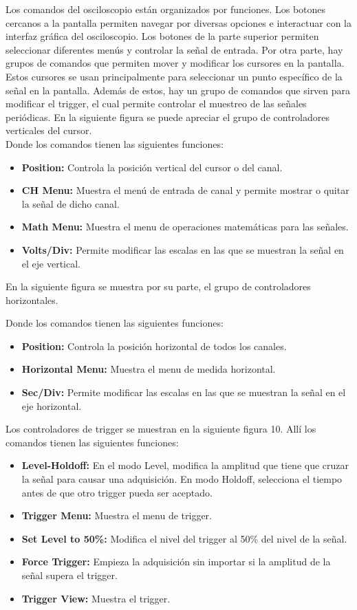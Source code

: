 \documentclass{scrartcl}
\begin{document}
Los comandos del osciloscopio están organizados por funciones. Los botones cercanos a la pantalla permiten navegar por diversas opciones e interactuar con la interfaz gráfica del osciloscopio. Los botones de la parte superior permiten seleccionar diferentes menús y controlar la señal de entrada. Por otra parte, hay grupos de comandos que permiten mover y modificar los cursores en la pantalla. Estos cursores se usan principalmente para seleccionar un punto específico de la señal en la pantalla. Además de estos, hay un grupo de comandos que sirven para modificar el trigger, el cual permite controlar el muestreo de las señales periódicas. En la siguiente figura se puede apreciar el grupo de controladores verticales del cursor.\\


Donde los comandos tienen las siguientes funciones:
\begin{itemize}
	\item \textbf{Position:} Controla la posición vertical del cursor o del canal. 
	\item \textbf{CH Menu:} Muestra el menú de entrada de canal y permite mostrar o quitar la señal de dicho canal.
	\item \textbf{Math Menu:} Muestra el menu de operaciones matemáticas para las señales.
	\item \textbf{Volts/Div:} Permite modificar las escalas en las que se muestran la señal en el eje vertical.

\end{itemize}

En la siguiente figura se muestra por su parte, el grupo de controladores horizontales.


Donde los comandos tienen las siguientes funciones:
\begin{itemize}
	\item \textbf{Position:} Controla la posición horizontal de todos los canales.
	\item \textbf{Horizontal Menu:} Muestra el menu de medida horizontal.
	\item \textbf{Sec/Div:} Permite modificar las escalas en las que se muestran la señal en el eje horizontal.
\end{itemize}

Los controladores de trigger se muestran en la siguiente figura 10. Allí los comandos tienen las siguientes funciones:

\begin{itemize}
	\item \textbf{Level-Holdoff:} En el modo Level, modifica la amplitud que tiene que cruzar la señal para causar una adquisición. En modo Holdoff, selecciona el tiempo antes de que otro trigger pueda ser aceptado.
	\item \textbf{Trigger Menu:} Muestra el menu de trigger.
	\item \textbf{Set Level to 50\%:} Modifica el nivel del trigger al 50\% del nivel de la señal.
	\item \textbf{Force Trigger:} Empieza la adquisición sin importar si la amplitud de la señal supera el trigger.
	\item \textbf{Trigger View:} Muestra el trigger.
\end{itemize}
\end{document}
